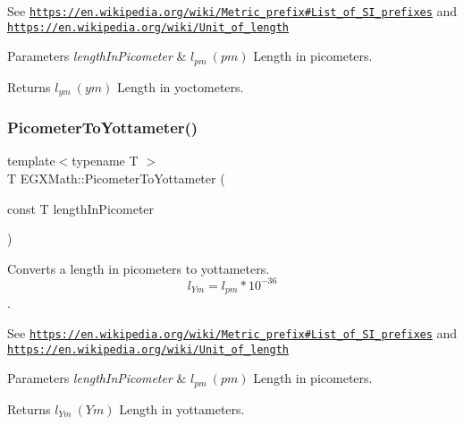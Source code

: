 See \href{https://en.wikipedia.org/wiki/Metric_prefix#List_of_SI_prefixes}{\tt https\+://en.\+wikipedia.\+org/wiki/\+Metric\+\_\+prefix\#\+List\+\_\+of\+\_\+\+S\+I\+\_\+prefixes} and \href{https://en.wikipedia.org/wiki/Unit_of_length}{\tt https\+://en.\+wikipedia.\+org/wiki/\+Unit\+\_\+of\+\_\+length} 
\begin{DoxyParams}{Parameters}
{\em length\+In\+Picometer} & $ l_{pm}\ (pm)$ Length in picometers. \\
\hline
\end{DoxyParams}
\begin{DoxyReturn}{Returns}
$ l_{ym}\ (ym)$ Length in yoctometers. 
\end{DoxyReturn}
\mbox{\label{group___e_g_x_math-_conversions-_length_conversions-_picometer-_s_i_ga02d71cee34c4570a0c17529eb481a26f}} 
\subsubsection{\texorpdfstring{Picometer\+To\+Yottameter()}{PicometerToYottameter()}}
{\footnotesize\ttfamily template$<$typename T $>$ \\
T E\+G\+X\+Math\+::\+Picometer\+To\+Yottameter (\begin{DoxyParamCaption}\item[{const T}]{length\+In\+Picometer }\end{DoxyParamCaption})}



Converts a length in picometers to yottameters. \[ l_{Ym}=l_{pm} * 10^{-36} \]. 

See \href{https://en.wikipedia.org/wiki/Metric_prefix#List_of_SI_prefixes}{\tt https\+://en.\+wikipedia.\+org/wiki/\+Metric\+\_\+prefix\#\+List\+\_\+of\+\_\+\+S\+I\+\_\+prefixes} and \href{https://en.wikipedia.org/wiki/Unit_of_length}{\tt https\+://en.\+wikipedia.\+org/wiki/\+Unit\+\_\+of\+\_\+length} 
\begin{DoxyParams}{Parameters}
{\em length\+In\+Picometer} & $ l_{pm}\ (pm)$ Length in picometers. \\
\hline
\end{DoxyParams}
\begin{DoxyReturn}{Returns}
$ l_{Ym}\ (Ym)$ Length in yottameters. 
\end{DoxyReturn}
\mbox{\label{group___e_g_x_math-_conversions-_length_conversions-_picometer-_s_i_ga6aa4200739cdc21650592e995e8945cd}} 
